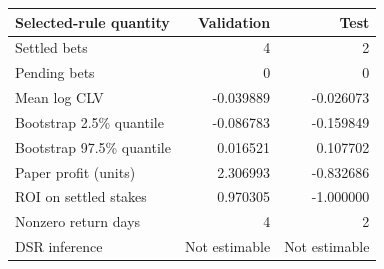 \begin{tabular}{lrr}
\toprule
Selected-rule quantity & Validation & Test \\
\midrule
Settled bets & 4 & 2 \\
Pending bets & 0 & 0 \\
Mean log CLV & -0.039889 & -0.026073 \\
Bootstrap 2.5\% quantile & -0.086783 & -0.159849 \\
Bootstrap 97.5\% quantile & 0.016521 & 0.107702 \\
Paper profit (units) & 2.306993 & -0.832686 \\
ROI on settled stakes & 0.970305 & -1.000000 \\
Nonzero return days & 4 & 2 \\
DSR inference & Not estimable & Not estimable \\
\bottomrule
\end{tabular}
